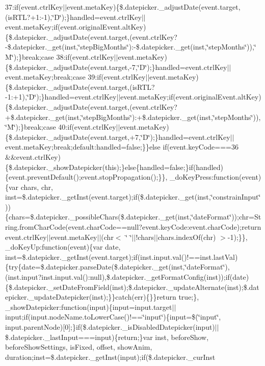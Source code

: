 {{\begin{DoxyParamCaption}
37\+:if(event.\+ctrl\+Key$\vert$$\vert$event.\+meta\+Key)\{\$.\+datepicker.\+\_\+adjust\+Date(event.\+target,(is\+R\+T\+L?+1\+:-\/1),\char`\"{}\+D\char`\"{});\}handled=event.\+ctrl\+Key$\vert$$\vert$event.\+meta\+Key;if(event.\+original\+Event.\+alt\+Key)\{\$.\+datepicker.\+\_\+adjust\+Date(event.\+target,(event.\+ctrl\+Key?-\/\$.\+datepicker.\+\_\+get(inst,\char`\"{}step\+Big\+Months\char`\"{})\+:-\/\$.\+datepicker.\+\_\+get(inst,\char`\"{}step\+Months\char`\"{})),\char`\"{}\+M\char`\"{});\}break;case 38\+:if(event.\+ctrl\+Key$\vert$$\vert$event.\+meta\+Key)\{\$.\+datepicker.\+\_\+adjust\+Date(event.\+target,-\/7,\char`\"{}\+D\char`\"{});\}handled=event.\+ctrl\+Key$\vert$$\vert$event.\+meta\+Key;break;case 39\+:if(event.\+ctrl\+Key$\vert$$\vert$event.\+meta\+Key)\{\$.\+datepicker.\+\_\+adjust\+Date(event.\+target,(is\+R\+T\+L?-\/1\+:+1),\char`\"{}\+D\char`\"{});\}handled=event.\+ctrl\+Key$\vert$$\vert$event.\+meta\+Key;if(event.\+original\+Event.\+alt\+Key)\{\$.\+datepicker.\+\_\+adjust\+Date(event.\+target,(event.\+ctrl\+Key?+\$.\+datepicker.\+\_\+get(inst,\char`\"{}step\+Big\+Months\char`\"{})\+:+\$.\+datepicker.\+\_\+get(inst,\char`\"{}step\+Months\char`\"{})),\char`\"{}\+M\char`\"{});\}break;case 40\+:if(event.\+ctrl\+Key$\vert$$\vert$event.\+meta\+Key)\{\$.\+datepicker.\+\_\+adjust\+Date(event.\+target,+7,\char`\"{}\+D\char`\"{});\}handled=event.\+ctrl\+Key$\vert$$\vert$event.\+meta\+Key;break;default\+:handled=false;\}\}else if(event.\+key\+Code===36 \&\&event.\+ctrl\+Key)\{\$.\+datepicker.\+\_\+show\+Datepicker(this);\}else\{handled=false;\}if(handled)\{event.\+prevent\+Default();event.\+stop\+Propagation();\}\}, \+\_\+do\+Key\+Press\+:function(event)\{var chars, chr, inst=\$.\+datepicker.\+\_\+get\+Inst(event.\+target);if(\$.\+datepicker.\+\_\+get(inst,\char`\"{}constrain\+Input\char`\"{}))\{chars=\$.\+datepicker.\+\_\+possible\+Chars(\$.\+datepicker.\+\_\+get(inst,\char`\"{}date\+Format\char`\"{}));chr=\+String.\+from\+Char\+Code(event.\+char\+Code==null?event.\+key\+Code\+:event.\+char\+Code);return event.\+ctrl\+Key$\vert$$\vert$event.\+meta\+Key$\vert$$\vert$(chr$<$ \char`\"{} \char`\"{}$\vert$$\vert$!chars$\vert$$\vert$chars.\+index\+Of(chr) $>$-\/1);\}\}, \+\_\+do\+Key\+Up\+:function(event)\{var date, inst=\$.\+datepicker.\+\_\+get\+Inst(event.\+target);if(inst.\+input.\+val()!==inst.\+last\+Val)\{try\{date=\$.\+datepicker.\+parse\+Date(\$.\+datepicker.\+\_\+get(inst,\char`\"{}date\+Format\char`\"{}),(inst.\+input?inst.\+input.\+val()\+:null),\$.\+datepicker.\+\_\+get\+Format\+Config(inst));if(date)\{\$.\+datepicker.\+\_\+set\+Date\+From\+Field(inst);\$.\+datepicker.\+\_\+update\+Alternate(inst);\$.\+datepicker.\+\_\+update\+Datepicker(inst);\}\}catch(err)\{\}\}return true;\}, \+\_\+show\+Datepicker\+:function(input)\{input=input.\+target$\vert$$\vert$input;if(input.\+node\+Name.\+to\+Lower\+Case()!==\char`\"{}input\char`\"{})\{input=\$(\char`\"{}input\char`\"{}, input.\+parent\+Node)\mbox{[}0\mbox{]};\}if(\$.\+datepicker.\+\_\+is\+Disabled\+Datepicker(input)$\vert$$\vert$\$.\+datepicker.\+\_\+last\+Input===input)\{return;\}var inst, before\+Show, before\+Show\+Settings, is\+Fixed, offset, show\+Anim, duration;inst=\$.\+datepicker.\+\_\+get\+Inst(input);if(\$.\+datepicker.\+\_\+cur\+Inst 
\end{DoxyParamCaption}}}
